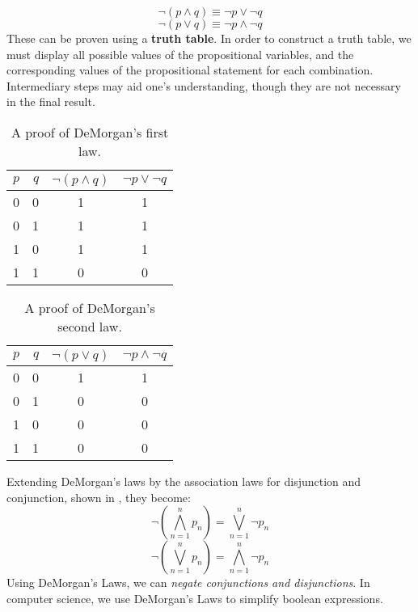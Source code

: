 \begin{equation}
  \neg (p \land q) \equiv \neg p \lor \neg q
\end{equation}
\begin{equation}
  \neg(p \lor q) \equiv \neg p \land \neg q
\end{equation}
These can be proven using a \textbf{truth table}.
In order to construct a truth table, we must display all possible values of the propositional variables,
and the corresponding values of the propositional statement for each combination.
Intermediary steps may aid one's understanding, though they are not necessary in the final result.
\begin{table}[H]
  \centering
    \begin{tabular}{lrcc}
      \toprule
      $p$ & $q$ & $\neg(p \land q)$ & $\neg p \lor \neg q$ \\ \midrule
      0 & 0 & 1 & 1 \\
      0 & 1 & 1 & 1\\
      1 & 0 & 1 & 1\\
      1 & 1 & 0 & 0\\
      \bottomrule
    \end{tabular}
  \caption{A proof of DeMorgan's first law.}
\end{table}

\begin{table}[H]
  \centering
    \begin{tabular}{lrcc}
      \toprule
      $p$ & $q$ & $\neg(p \lor q)$ & $\neg p \land \neg q$ \\ \midrule
      0 & 0 & 1 & 1 \\
      0 & 1 & 0 & 0 \\
      1 & 0 & 0 & 0 \\
      1 & 1 & 0 & 0 \\
      \bottomrule
    \end{tabular}
  \caption{A proof of DeMorgan's second law.}
\end{table}

Extending DeMorgan's laws by the association laws for disjunction and conjunction, shown in , they become:
\begin{equation}
 \neg\left(\bigwedge^n_{n=1} p_n\right)=\bigvee^n_{n=1} \neg p_n
\end{equation}
\begin{equation}
 \neg\left(\bigvee^n_{n=1} p_n\right)=\bigwedge^n_{n=1} \neg p_n
\end{equation}
Using DeMorgan's Laws, we can \emph{negate conjunctions and disjunctions}.
In computer science, we use DeMorgan's Laws to simplify boolean expressions.

